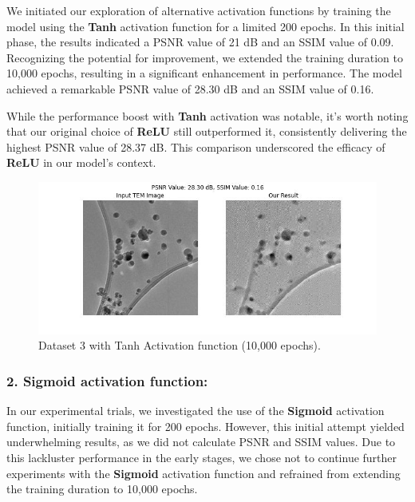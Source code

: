 We initiated our exploration of alternative activation functions by training the model using the \textbf{Tanh} activation function for a limited 200 epochs. In this initial phase, the results indicated a PSNR value of 21 dB and an SSIM value of 0.09. Recognizing the potential for improvement, we extended the training duration to 10,000 epochs, resulting in a significant enhancement in performance. The model achieved a remarkable PSNR value of 28.30 dB and an SSIM value of 0.16.

\vspace{10pt}

While the performance boost with \textbf{Tanh} activation was notable, it's worth noting that our original choice of \textbf{ReLU} still outperformed it, consistently delivering the highest PSNR value of 28.37 dB. This comparison underscored the efficacy of \textbf{ReLU} in our model's context.
\begin{figure}[H]
    \centering
    \includegraphics[width=1\textwidth]{img/Dataset_3_with_1000_epochs_Tanh_Activation_Function.jpg}
    \caption{Dataset 3 with Tanh Activation function (10,000 epochs).}\label{fig:Dataset_3_with_Tanh_10000_epochs.jpg}
\end{figure}

\subsubsection{2. Sigmoid activation function:}


In our experimental trials, we investigated the use of the \textbf{Sigmoid} activation function, initially training it for 200 epochs. However, this initial attempt yielded underwhelming results, as we did not calculate PSNR and SSIM values. Due to this lackluster performance in the early stages, we chose not to continue further experiments with the \textbf{Sigmoid} activation function and refrained from extending the training duration to 10,000 epochs.

